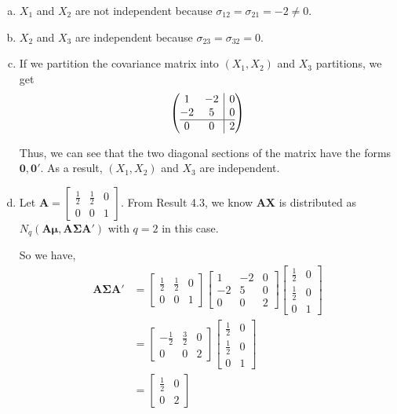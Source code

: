 \documentclass[12pt]{article}\usepackage[]{graphicx}\usepackage[]{color}
\newcommand{\vct}{\mathbf}
\begin{document}
\begin{enumerate}[a)]

\item $X_1$ and $X_2$ are not independent because $\sigma_{12} = \sigma_{21} = -2 \neq 0$.

\item $X_2$ and $X_3$ are independent because $\sigma_{23} = \sigma_{32} = 0$.

\item If we partition the covariance matrix into $(X_1, X_2)$ and $X_3$ partitions, we get
\begin{align*}
\left(\begin{array}{@{}cc|c@{}}
    1 & -2 & 0 \\
    -2 & 5 & 0 \\\hline
    0 & 0 & 2
  \end{array}\right)
\end{align*}

Thus, we can see that the two diagonal sections of the matrix have the forms $\vct{0}, \vct{0}'$. As a result, $(X_1, X_2)$ and $X_3$ are independent.

\item Let $\vct{A} = \begin{bmatrix} \frac{1}{2} & \frac{1}{2} & 0 \\ 0 & 0 & 1\end{bmatrix}$. From Result 4.3, we know $\vct{A}\vct{X}$ is distributed as $N_q(\vct{A}\vct{\mu}, \vct{A}\vct{\Sigma}\vct{A}')$ with $q = 2$ in this case.

So we have,
\begin{align*}
\vct{A}\vct{\Sigma}\vct{A}' &= \begin{bmatrix} \frac{1}{2} & \frac{1}{2} & 0 \\ 0 & 0 & 1\end{bmatrix} \begin{bmatrix} 1 & -2 & 0 \\ -2 & 5 & 0 \\ 0 & 0 & 2 \end{bmatrix} \begin{bmatrix} \frac{1}{2} & 0 \\ \frac{1}{2} & 0 \\ 0 & 1\end{bmatrix}\\
&= \begin{bmatrix} -\frac{1}{2} & \frac{3}{2} & 0 \\ 0 & 0 & 2\end{bmatrix} \begin{bmatrix} \frac{1}{2} & 0 \\ \frac{1}{2} & 0 \\ 0 & 1\end{bmatrix}\\
&= \begin{bmatrix} \frac{1}{2} & 0 \\ 0 & 2 \end{bmatrix}
\end{align*}


\end{enumerate}
\end{document}
